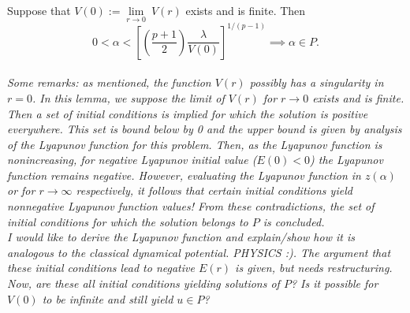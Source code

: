 \newpage
\begin{lemma}\label{lya}Suppose that $V(0):=\underset{r\to0}{\lim}~V(r)$ exists and is finite. Then $$0<\alpha<\left[\left(\frac{p+1}{2}\right)\frac{\lambda}{V(0)} \right]^{1/(p-1)}\implies \alpha\in P.$$\\

\emph{\color{teal}Some remarks: as mentioned, the function $V(r)$ possibly has a singularity in $r=0$. In this lemma, we suppose the limit of $V(r)$ for $r\to0$ exists and is finite. Then a set of initial conditions is implied for which the solution is positive everywhere. This set is bound below by 0 and the upper bound is given by analysis of the Lyapunov function for this problem. Then, as the Lyapunov function is nonincreasing, for negative Lyapunov initial value ($E(0)<0$) the Lyapunov function remains negative. However, evaluating the Lyapunov function in $z(\alpha)$ or for $r\to\infty$ respectively, it follows that certain initial conditions yield nonnegative Lyapunov function values! From these contradictions, the set of initial conditions for which the solution belongs to $P$ is concluded.}\\[11pt]

\emph{\color{red}I would like to derive the Lyapunov function and explain/show how it is analogous to the classical dynamical potential. PHYSICS :). The argument that these initial conditions lead to negative $E(r)$ is given, but needs restructuring. Now, are these all initial conditions yielding solutions of $P$? Is it possible for $V(0)$ to be infinite and still yield $u\in P$?}


\end{lemma}
